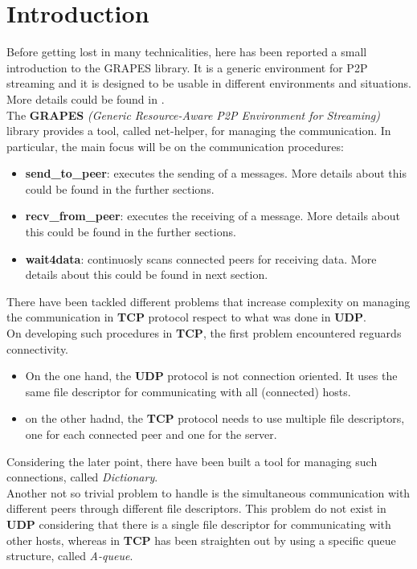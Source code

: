 \section{Introduction}
\label{ch:intro}
Before getting lost in many technicalities, here has been reported a small
introduction to the GRAPES library. It is a generic environment for P2P
streaming and it is designed to be usable in different environments and
situations. More details could be found in \cite{disi10-038}.\\
The \textbf{GRAPES} \textit{(Generic Resource-Aware P2P Environment for Streaming)} library provides a tool,
called net-helper, for managing the communication. 
In particular, the main focus will be on the communication procedures:
\begin{itemize}
  \item \textbf{send\_to\_peer}: executes the sending of a messages. More details about
    this could be found in the further sections.
  \item \textbf{recv\_from\_peer}: executes the receiving of a message. More details about
    this could be found in the further sections.
  \item \textbf{wait4data}:  continuosly scans connected peers for receiving data.
    More details about this could be found in next section.
\end{itemize}
There have been tackled different problems that increase complexity on managing the communication in
\textbf{TCP} protocol respect to what was done in \textbf{UDP}.\\
On developing such procedures in \textbf{TCP}, the first problem encountered reguards connectivity.
\begin{itemize}
 \item On the one hand, the \textbf{UDP} protocol is not connection oriented. It uses the same file descriptor
       for communicating with all (connected) hosts.
 \item on the other hadnd, the \textbf{TCP} protocol needs to use multiple file descriptors, one for each
   connected peer and one for the server.
\end{itemize}
Considering the later point, there have been built a tool for managing such connections, called
\textit{Dictionary}.\\
Another not so trivial problem to handle is the simultaneous communication with different peers through different
file descriptors. This problem do not exist in \textbf{UDP} considering that there is a single file descriptor
for communicating with other hosts, whereas in \textbf{TCP} has been straighten out by using a specific
queue structure, called \textit{A-queue}.

